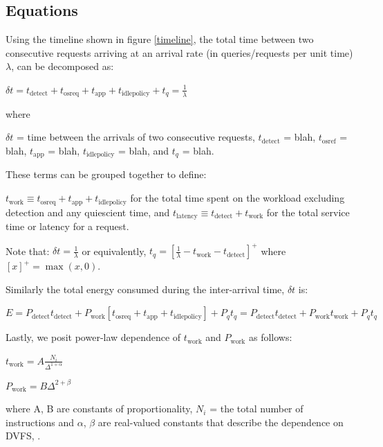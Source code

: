 \label{sec:model}


\subsection{Equations}

Using the timeline shown in figure \ref{timeline}, the total time between two consecutive requests arriving at an arrival rate (in queries/requests per unit time) $\lambda$, can be decomposed as:

$\boxed{\delta t = t_{\text{detect}} + t_{\text{osreq}} + t_{\text{app}} + t_{\text{idlepolicy}} + t_q} = \frac{1}{\lambda}$

where 

$\delta t$ = time between the arrivals of two consecutive requests, $t_{\text{detect}}$ = blah, $t_{\text{osref}}$ = blah, $t_{\text{app}}$ = blah, $t_{\text{idlepolicy}}$ = blah, and $t_q$ = blah.

These terms can be grouped together to define:

$t_{\text{work}} \equiv t_{\text{osreq}} + t_{\text{app}} + t_{\text{idlepolicy}}$ for the total time spent on the workload excluding detection and any quiescient time, and $t_{\text{latency}} \equiv t_{\text{detect}} + t_{\text{work}}$ for the total service time or latency for a request.

Note that: $\delta t = \frac{1}{\lambda}$ or equivalently, $t_q = \left[\frac{1}{\lambda} - t_\text{work} - t_{\text{detect}}\right]^+$ where $[x]^+ = \max(x,0)$.


Similarly the total energy consumed during the inter-arrival time, $\delta t$ is:

$\boxed{E = P_\text{detect} t_{\text{detect}} + P_{\text{work}} \left[t_{\text{osreq}} + t_{\text{app}} + t_{\text{idlepolicy}}\right] + P_q t_q} = P_\text{detect} t_{\text{detect}} + P_{\text{work}} t_{\text{work}} + P_q t_q$

Lastly, we posit power-law dependence of $t_{\text{work}}$ and $P_{\text{work}}$ as follows:

$t_{\text{work}} = A\frac{N_i}{\Delta^{1+\alpha}}$

$P_{\text{work}} = B \Delta^{2+\beta}$

where A, B are constants of proportionality, $N_i$ = the total number of instructions and $\alpha$, $\beta$ are real-valued constants that describe the dependence on DVFS, \Delta.

